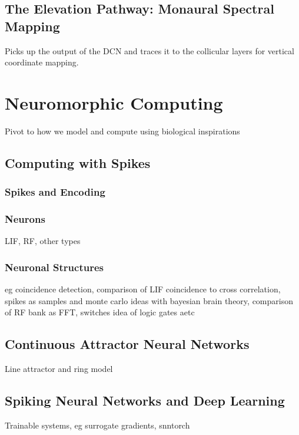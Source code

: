 \subsection{The Elevation Pathway: Monaural Spectral Mapping}
\label{sec:elevation_pathway}
Picks up the output of the DCN and traces it to the collicular layers for vertical coordinate mapping.


\section{Neuromorphic Computing}

Pivot to how we model and compute using biological inspirations

\subsection{Computing with Spikes}

\subsubsection{Spikes and Encoding}

\subsubsection{Neurons}

LIF, RF, other types

\subsubsection{Neuronal Structures}

eg coincidence detection, comparison of LIF coincidence to cross correlation, spikes as samples and monte carlo ideas with bayesian brain theory, comparison of RF bank as FFT, switches idea of logic gates aetc

\subsection{Continuous Attractor Neural Networks}

Line attractor and ring model

\subsection{Spiking Neural Networks and Deep Learning}

Trainable systems, eg surrogate gradients, snntorch

